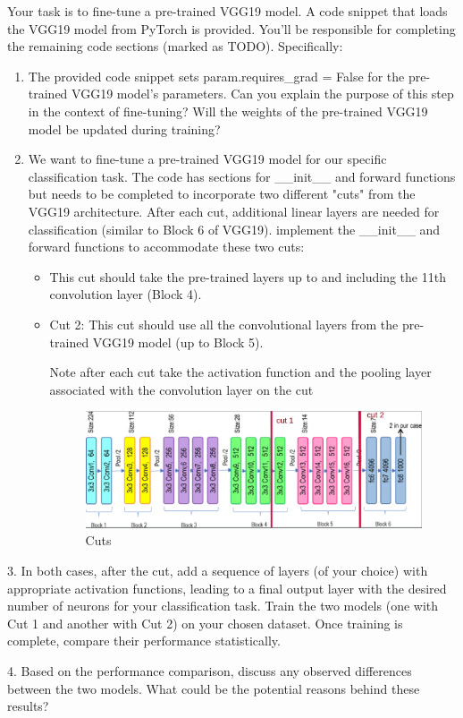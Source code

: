 \documentclass[11pt]{scrartcl}
\begin{document}
Your task is to fine-tune a pre-trained VGG19 model. A code snippet that loads the VGG19 model from PyTorch is provided. You'll be responsible for completing the remaining code sections (marked as TODO).  Specifically:

\begin{enumerate}
    \item The provided code snippet sets param.requires\_grad = False for the pre-trained VGG19 model's parameters. Can you explain the purpose of this step in the context of fine-tuning? Will the weights of the pre-trained VGG19 model be updated during training?

    \item We want to fine-tune a pre-trained VGG19 model for our specific classification task. The code has sections for \_\_init\_\_ and forward functions but needs to be completed to incorporate two different "cuts" from the VGG19 architecture. After each cut, additional linear layers are needed for classification (similar to Block 6 of VGG19).
implement the \_\_init\_\_ and forward functions to accommodate these two cuts:
\begin{itemize}
    \item This cut should take the pre-trained layers up to and including the 11th convolution layer (Block 4).

    \item Cut 2: This cut should use all the convolutional layers from the pre-trained VGG19 model (up to Block 5).
    
Note after each cut take the activation function and the pooling layer associated with the convolution layer on the cut

\begin{figure}[th]
\centering
\includegraphics[scale=0.35]{cuts.png}
\caption{Cuts}
\label{fig:scenario}
\end{figure}
\end{itemize}

\end{enumerate}



3. In both cases, after the cut, add a sequence of layers (of your choice) with appropriate activation functions, leading to a final output layer with the desired number of neurons for your classification task.
Train the two models (one with Cut 1 and another with Cut 2) on your chosen dataset. Once training is complete, compare their performance statistically.

4. Based on the performance comparison, discuss any observed differences between the two models. What could be the potential reasons behind these results?
\end{document}
